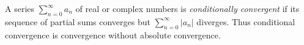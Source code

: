 
A series $\sum_{n=0}^\infty a_n$ of real or complex numbers is \emph{conditionally convergent} if its sequence of partial sums converges but $\sum_{n=0}^\infty |a_n|$ diverges. Thus conditional convergence is convergence without absolute convergence.
